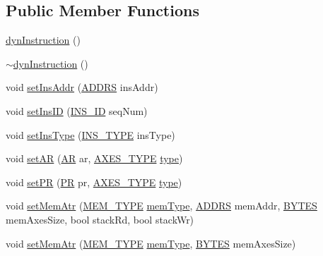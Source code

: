 \subsection*{Public Member Functions}
\begin{DoxyCompactItemize}
\item 
\hyperlink{classdynInstruction_a0f3a48343375c9e3205b7c09127e95f9}{dynInstruction} ()
\item 
\hyperlink{classdynInstruction_a133d35bbe8cd2afdf8f7c9618beb3759}{$\sim$dynInstruction} ()
\item 
void \hyperlink{classdynInstruction_a0088b0057fb6a8dd41dee05d79387f7c}{setInsAddr} (\hyperlink{global_2global_8h_a7ea74bb9ffd2e4d41550ae2383dd25bc}{ADDRS} insAddr)
\item 
void \hyperlink{classdynInstruction_a47de890f2ae5bb33e384a7c21a54fbec}{setInsID} (\hyperlink{global_2global_8h_a1883c47d0023d0f200e1d86eced6a070}{INS\_\-ID} seqNum)
\item 
void \hyperlink{classdynInstruction_ae7c165e2f688432713ea575b2a5477fe}{setInsType} (\hyperlink{binaryTranslator_2global_8h_a7aead736a07eaf25623ad7bfa1f0ee2d}{INS\_\-TYPE} insType)
\item 
void \hyperlink{classdynInstruction_a27b7ba0720a85d516c3885bddf154765}{setAR} (\hyperlink{global_2global_8h_a735ca3cb7fa17e60af6701a846722516}{AR} ar, \hyperlink{binaryTranslator_2global_8h_a94b8423a23b95a7adac22848b81e7c0c}{AXES\_\-TYPE} \hyperlink{binaryTranslator_2global_8h_a7aead736a07eaf25623ad7bfa1f0ee2d}{type})
\item 
void \hyperlink{classdynInstruction_a86ac41fe463dde2aee30a22d8bc243ad}{setPR} (\hyperlink{global_2global_8h_a54dcae2ba04c76c12afe113b706bd4dc}{PR} pr, \hyperlink{binaryTranslator_2global_8h_a94b8423a23b95a7adac22848b81e7c0c}{AXES\_\-TYPE} \hyperlink{binaryTranslator_2global_8h_a7aead736a07eaf25623ad7bfa1f0ee2d}{type})
\item 
void \hyperlink{classdynInstruction_a5751f811a01cf9f08e0b964db98a7c0e}{setMemAtr} (\hyperlink{global_2global_8h_a40bc49627faaf5adeed28388c6ffae9c}{MEM\_\-TYPE} \hyperlink{binaryTranslator_2global_8h_a94b8423a23b95a7adac22848b81e7c0c}{memType}, \hyperlink{global_2global_8h_a7ea74bb9ffd2e4d41550ae2383dd25bc}{ADDRS} memAddr, \hyperlink{global_2global_8h_a430d9e51ff815ddfce06905ae7392e83}{BYTES} memAxesSize, bool stackRd, bool stackWr)
\item 
void \hyperlink{classdynInstruction_a2608f4e8ea89c4ea370f0dab131d78ba}{setMemAtr} (\hyperlink{global_2global_8h_a40bc49627faaf5adeed28388c6ffae9c}{MEM\_\-TYPE} \hyperlink{binaryTranslator_2global_8h_a94b8423a23b95a7adac22848b81e7c0c}{memType}, \hyperlink{global_2global_8h_a430d9e51ff815ddfce06905ae7392e83}{BYTES} memAxesSize)

\end{DoxyCompactItemize}
